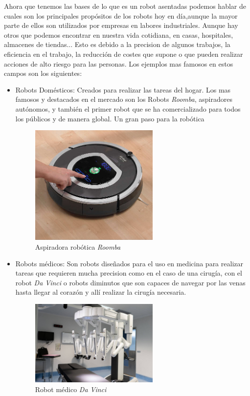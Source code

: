 Ahora que tenemos las bases de lo que es un robot asentadas podemos hablar de cuales son los principales propósitos de los robots hoy en día,aunque la mayor parte de ellos son utilizados por empresas en labores industriales. Aunque hay otros que podemos encontrar en nuestra vida cotidiana, en casas, hospitales, almacenes de tiendas... Esto es debido a la precision de algunos trabajos, la eficiencia en el trabajo, la reducción de costes que supone o que pueden realizar acciones de alto riesgo para las personas. Los ejemplos mas famosos en estos campos son los siguientes:
\begin{itemize}
    \item Robots Domésticos: Creados para realizar las tareas del hogar. Los mas famosos y destacados en el mercado son los Robots \textit{Roomba}, aspiradores autónomos, y también el primer robot que se ha comercializado para todos los públicos y de manera global. Un gran paso para la robótica

\begin{figure}[H]
    \centering
    \includegraphics[width=0.6\textwidth]{img/roomba.jpg}
    \caption{Aspiradora robótica \textit{Roomba}} \label{fig:roomba}
    \end{figure}

    \item Robots médicos: Son robots diseñados para el uso en medicina para realizar tareas que requieren mucha precision como en el caso de una cirugía, con el robot \textit{Da Vinci} o robots diminutos que son capaces de navegar por las venas hasta llegar al corazón y allí realizar la cirugía necesaria.
      \begin{figure}[H]
    \centering
    \includegraphics[width=0.6\textwidth]{img/davinci.jpg}
    \caption{Robot médico \textit{Da Vinci}} \label{fig:davinci}
    \end{figure}
    

\end{itemize}
